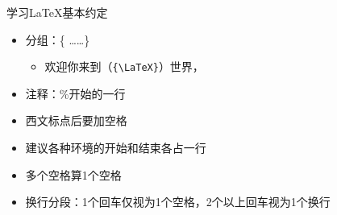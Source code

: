 \documentclass[xcolor=svgnames, t, aspectratio=169]{ctexbeamer}
\begin{document}

\begin{frame}[t,fragile]{学习\LaTeX}{基本约定}
  \stretchon
  \begin{itemize}
  \item 分组：\{ \ldots\ldots \}
    \begin{itemize}
    \item 欢迎你来到{\latex}（\verb|{\LaTeX}|）世界，
    \end{itemize}
  \item 注释：\%开始的一行
  \item 西文标点后要加空格
  \item 建议各种环境的开始和结束各占一行
  \item 多个空格算1个空格
  \item \alert{换行分段}：1个回车仅视为1个空格，2个以上回车视为1个换行
  \end{itemize}
  \stretchoff
\end{frame}
\end{document}
